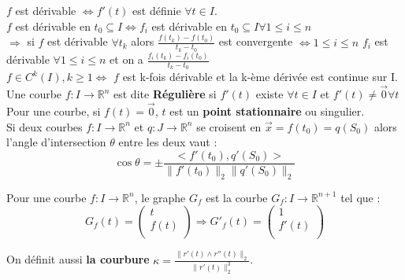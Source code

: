 \documentclass[../main.tex]{subfiles}
\begin{document}
$f$ est dérivable $\Leftrightarrow f'(t)$ est définie $\forall t \in I$.\\

$f$ est dérivable en $t_0 \subseteq I \Leftrightarrow f_i$ est dérivable en $t_0 \subseteq I \forall 1 \leq i \leq n$\\
$\Rightarrow$ si $f$ est dérivable $\forall t_k$ alors $\frac{f(t_k)-f(t_0)}{t_k-t_0}$ est convergente $\Leftrightarrow 1\leq i \leq n $ $f_i$ est dérivable $\forall 1\leq i \leq n$ et on a $\frac{f_i(t_k)-f_i(t_0)}{t_k-t_0}$\\

$f \in C^k(I), k\geq 1 \Leftrightarrow$ $f$ est k-fois dérivable et la k-ème dérivée est continue sur I.\\

Une courbe $f:I\rightarrow \mathbb{R}^n$ est dite \textbf{Régulière} si $f'(t)$ existe $\forall t\in I$ et $f'(t) \neq \vec{0} \forall t$\\

Pour une courbe, si $f(t) = \vec{0}$, $t$ est un \textbf{point stationnaire} ou singulier.\\

Si deux courbes $f:I\rightarrow \mathbb{R}^n$ et $q: J\rightarrow \mathbb{R}^n$ se croisent en $\vec{x} = f(t_0) = q(S_0)$ alors l'angle d'intersection $\theta$ entre les deux vaut :\\
\begin{equation}
    \cos{\theta} = \pm \frac{<f'(t_0), q'(S_0)>}{\parallel f'(t_0)\parallel_2 \parallel q'(S_0)\parallel_2}
\end{equation}

 Pour une courbe $f:I\rightarrow \mathbb{R}^n$, le graphe $G_f$ est la courbe $G_f:I\rightarrow \mathbb{R}^{n+1}$ tel que :\\
 \begin{equation}
     G_f(t) = \begin{pmatrix}
         t\\
         f(t)\\
     \end{pmatrix} \Rightarrow G'_f(t) = \begin{pmatrix}
         1\\
         f'(t)\\
     \end{pmatrix}
 \end{equation}

On définit aussi \textbf{la courbure} $\kappa = \frac{\parallel r'(t) \wedge r''(t)\parallel_2}{\parallel r'(t)\parallel^3_2}$.\\
\end{document}
